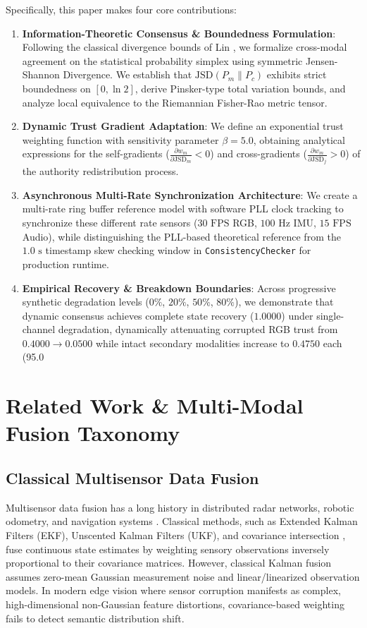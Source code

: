 \documentclass[conference]{IEEEtran}
\begin{document}
Specifically, this paper makes four core contributions:
\begin{enumerate}
    \item \textbf{Information-Theoretic Consensus \& Boundedness Formulation}: Following the classical divergence bounds of Lin \cite{lin1991divergence}, we formalize cross-modal agreement on the statistical probability simplex using symmetric Jensen-Shannon Divergence. We establish that $\mathrm{JSD}(P_m \parallel P_c)$ exhibits strict boundedness on $[0, \ln 2]$, derive Pinsker-type total variation bounds, and analyze local equivalence to the Riemannian Fisher-Rao metric tensor.
    \item \textbf{Dynamic Trust Gradient Adaptation}: We define an exponential trust weighting function with sensitivity parameter $\beta = 5.0$, obtaining analytical expressions for the self-gradients ($\frac{\partial w_m}{\partial \mathrm{JSD}_m} < 0$) and cross-gradients ($\frac{\partial w_m}{\partial \mathrm{JSD}_j} > 0$) of the authority redistribution process.
    \item \textbf{Asynchronous Multi-Rate Synchronization Architecture}: We create a multi-rate ring buffer reference model with software PLL clock tracking to synchronize these different rate sensors ($30\text{ FPS}$ RGB, $100\text{ Hz}$ IMU, $15\text{ FPS}$ Audio), while distinguishing the PLL-based theoretical reference from the $1.0\text{ s}$ timestamp skew checking window in \texttt{ConsistencyChecker} for production runtime.
    \item \textbf{Empirical Recovery \& Breakdown Boundaries}: Across progressive synthetic degradation levels ($0\%$, $20\%$, $50\%$, $80\%$), we demonstrate that dynamic consensus achieves complete state recovery ($1.0000$) under single-channel degradation, dynamically attenuating corrupted RGB trust from $0.4000 \to 0.0500$ while intact secondary modalities increase to $0.4750$ each (95.0%
\end{enumerate}

\section{Related Work \& Multi-Modal Fusion Taxonomy}
\subsection{Classical Multisensor Data Fusion}
Multisensor data fusion has a long history in distributed radar networks, robotic odometry, and navigation systems \cite{khaleghi2013multisensor, liggins2008handbook}. Classical methods, such as Extended Kalman Filters (EKF), Unscented Kalman Filters (UKF), and covariance intersection \cite{julier2000new}, fuse continuous state estimates by weighting sensory observations inversely proportional to their covariance matrices. However, classical Kalman fusion assumes zero-mean Gaussian measurement noise and linear/linearized observation models. In modern edge vision where sensor corruption manifests as complex, high-dimensional non-Gaussian feature distortions, covariance-based weighting fails to detect semantic distribution shift.
\end{document}
